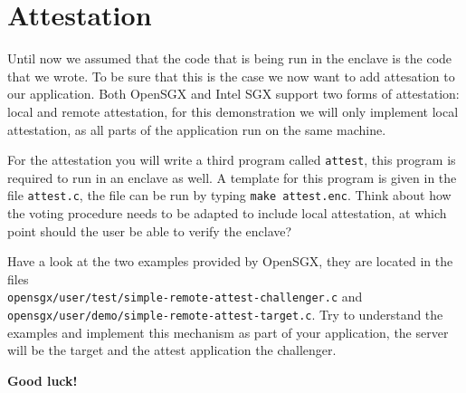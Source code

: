 \documentclass{uulm-assignment}
\begin{document}
    \section{Attestation}
    Until now we assumed that the code that is being run in the enclave is the code that we wrote. To be sure that
    this is the case we now want to add attesation to our application. Both OpenSGX and Intel SGX support two
    forms of attestation: local and remote attestation, for this demonstration we will only implement local
    attestation, as all parts of the application run on the same machine. 

    For the attestation you will write a third program called \texttt{attest}, this program is required to run in
    an enclave as well. A template for this program is given in the file \texttt{attest.c}, the file can be run
    by typing \texttt{make attest.enc}. Think about how the voting procedure needs to be adapted to include local
    attestation, at which point should the user be able to verify the enclave?

    Have a look at the two examples provided by OpenSGX, they are located in the files \\
    \texttt{opensgx/user/test/simple-remote-attest-challenger.c} and \\
    \texttt{opensgx/user/demo/simple-remote-attest-target.c}. Try to understand the
    examples and implement this mechanism as part of your application, the server will
    be the target and the attest application the challenger.


    \textbf{Good luck!}
\end{document}
